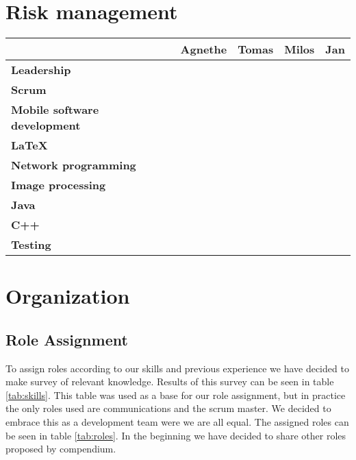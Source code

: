 \documentclass{article}
\newcommand{\ra}[1]{\renewcommand{\arraystretch}{#1}}
\newcommand{\colorA}{\cellcolor{green!100}}
\newcommand{\colorB}{\cellcolor{green!60}}
\newcommand{\colorC}{\cellcolor{yellow!75}}
\newcommand{\colorD}{\cellcolor{orange!90}}
\newcommand{\colorE}{\cellcolor{red!80}}
\begin{document}
\section{Risk management}

\begin{table*}\centering \ra{1.3}
    \caption{Skills and previous experience table. Coding:
        \textcolor{green!100}{$\bullet$} expert,
        \textcolor{green!60}{$\bullet$} experienced,
        \textcolor{yellow!75}{$\bullet$} neutral,
        \textcolor{orange!90}{$\bullet$} little experience,
        \textcolor{red!80}{$\bullet$} no experience}
    \label{tab:skills}
    \vspace{2mm}
    \begin{tabular}{lcccc}
    \toprule
                                & Agnethe   & Tomas & Milos & Jan \\
    \midrule
    \textbf{Leadership                 } & \colorB & \colorE & \colorD & \colorC \\ 
    \textbf{Scrum                      } & \colorB & \colorE & \colorE & \colorE \\ 
    \textbf{Mobile software development} & \colorC & \colorE & \colorB & \colorE \\ 
    \textbf{\LaTeX                     } & \colorE & \colorB & \colorE & \colorB \\ 
    \textbf{Network programming        } & \colorD & \colorC & \colorC & \colorC \\ 
    \textbf{Image processing           } & \colorE & \colorC & \colorE & \colorD \\ 
    \textbf{Java                       } & \colorC & \colorD & \colorA & \colorE \\ 
    \textbf{C++                        } & \colorE & \colorB & \colorC & \colorB \\ 
    \textbf{Testing                    } & \colorE & \colorB & \colorD & \colorC \\
    \bottomrule
    \end{tabular}
\end{table*}

\section{Organization}

\subsection{Role Assignment}
To assign roles according to our skills and previous experience we have decided to make survey of relevant knowledge. 
Results of this survey can be seen in table \ref{tab:skills}. 
This table was used as a base for our role assignment, but in practice the only roles used are communications and the scrum master. We decided to embrace this as a development team were we are all equal. 
The assigned roles can be seen in table \ref{tab:roles}. 
In the beginning we have decided to share other roles proposed by compendium.
\end{document}
